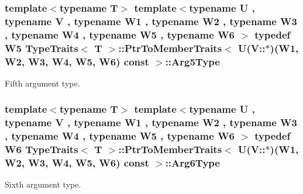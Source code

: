 \subsubsection[{\texorpdfstring{Arg5\+Type}{Arg5Type}}]{\setlength{\rightskip}{0pt plus 5cm}template$<$typename T$>$ template$<$typename U , typename V , typename W1 , typename W2 , typename W3 , typename W4 , typename W5 , typename W6 $>$ typedef W5 {\bf Type\+Traits}$<$ T $>$\+::{\bf Ptr\+To\+Member\+Traits}$<$ U(V\+::$\ast$)(W1, W2, W3, W4, W5, W6) const  $>$\+::{\bf Arg5\+Type}}\hypertarget{structTypeTraits_1_1PtrToMemberTraits_3_01U_07V_1_1_5_08_07W1_00_01W2_00_01W3_00_01W4_00_01W5_00_01W6_08_01const_01_01_4_a0a6651b9e4612abe3e3cc912a1907e0f}{}\label{structTypeTraits_1_1PtrToMemberTraits_3_01U_07V_1_1_5_08_07W1_00_01W2_00_01W3_00_01W4_00_01W5_00_01W6_08_01const_01_01_4_a0a6651b9e4612abe3e3cc912a1907e0f}
Fifth argument type. 
\subsubsection[{\texorpdfstring{Arg6\+Type}{Arg6Type}}]{\setlength{\rightskip}{0pt plus 5cm}template$<$typename T$>$ template$<$typename U , typename V , typename W1 , typename W2 , typename W3 , typename W4 , typename W5 , typename W6 $>$ typedef W6 {\bf Type\+Traits}$<$ T $>$\+::{\bf Ptr\+To\+Member\+Traits}$<$ U(V\+::$\ast$)(W1, W2, W3, W4, W5, W6) const  $>$\+::{\bf Arg6\+Type}}\hypertarget{structTypeTraits_1_1PtrToMemberTraits_3_01U_07V_1_1_5_08_07W1_00_01W2_00_01W3_00_01W4_00_01W5_00_01W6_08_01const_01_01_4_afdd9b651a9b4cac3d667e77b6dfb6120}{}\label{structTypeTraits_1_1PtrToMemberTraits_3_01U_07V_1_1_5_08_07W1_00_01W2_00_01W3_00_01W4_00_01W5_00_01W6_08_01const_01_01_4_afdd9b651a9b4cac3d667e77b6dfb6120}
Sixth argument type. 
